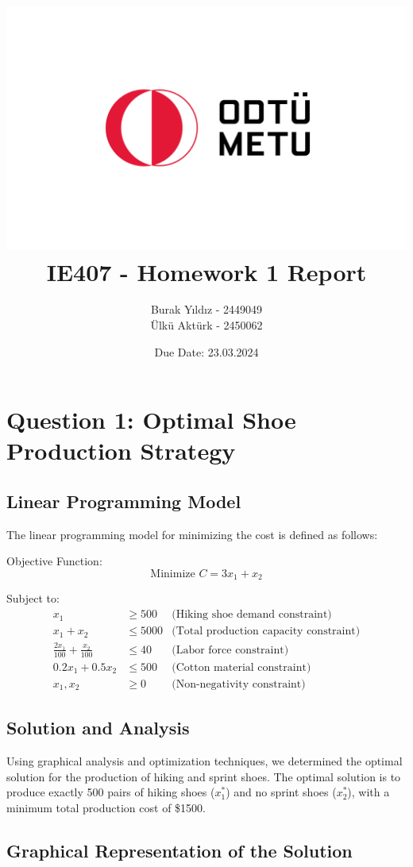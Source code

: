 \documentclass[12pt]{article}
\title{\includegraphics{9.4.png}\\ IE407 - Homework 1 Report}
\author{Burak Yıldız - 2449049 \\ Ülkü Aktürk - 2450062}
\date{Due Date: 23.03.2024}
\begin{document}
\maketitle
\newpage
\section*{Question 1: Optimal Shoe Production Strategy}

\subsection*{Linear Programming Model}

The linear programming model for minimizing the cost is defined as follows:

Objective Function:
\begin{equation*}
    \text{Minimize } C = 3x_1 + x_2
\end{equation*}

Subject to:
\begin{align*}
    x_1 &\geq 500 &\text{(Hiking shoe demand constraint)} \\
    x_1 + x_2 &\leq 5000 &\text{(Total production capacity constraint)} \\
    \frac{2x_1}{100} + \frac{x_2}{100} &\leq 40 &\text{(Labor force constraint)} \\
    0.2x_1 + 0.5x_2 &\leq 500 &\text{(Cotton material constraint)} \\
    x_1, x_2 &\geq 0 &\text{(Non-negativity constraint)}
\end{align*}

\subsection*{Solution and Analysis}

Using graphical analysis and optimization techniques, we determined the optimal solution for the production of hiking and sprint shoes. The optimal solution is to produce exactly 500 pairs of hiking shoes (\(x_1^*\)) and no sprint shoes (\(x_2^*\)), with a minimum total production cost of \$1500.

\subsection*{Graphical Representation of the Solution}
\end{document}
